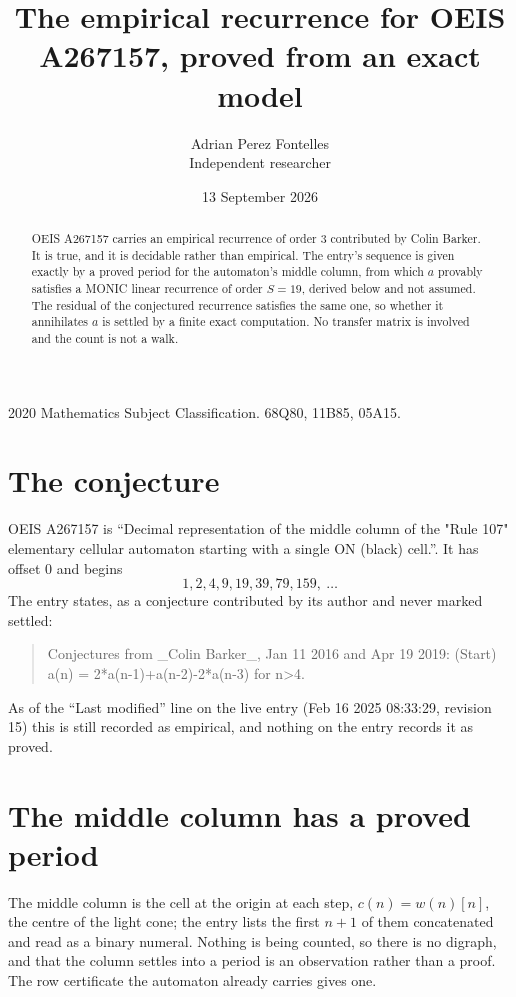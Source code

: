 \documentclass[11pt,a4paper]{article}
\title{The empirical recurrence for OEIS A267157, proved from an exact model}
\author{Adrian Perez Fontelles\\ \small Independent researcher}
\date{13 September 2026}
\theoremstyle{plain}
\theoremstyle{definition}
\begin{document}
\maketitle

\begin{abstract}
OEIS A267157 carries an empirical recurrence of order $3$ contributed by Colin Barker. It is true, and it is
decidable rather than empirical. The entry's sequence is given exactly by a proved period for the automaton's middle column, from
which $a$ provably satisfies a MONIC linear recurrence of order $S=19$, derived below and not
assumed. The residual of the conjectured recurrence satisfies the same one, so whether it
annihilates $a$ is settled by a finite exact computation. No transfer matrix is involved and
the count is not a walk.
\end{abstract}

\noindent\small 2020 Mathematics Subject Classification. 68Q80, 11B85, 05A15.\normalsize

\section{The conjecture}

OEIS A267157 is ``Decimal representation of the middle column of the "Rule 107" elementary cellular automaton starting with a single ON (black) cell.''. It has offset $0$ and begins
\[
1, 2, 4, 9, 19, 39, 79, 159,\ \dots
\]
The entry states, as a conjecture contributed by its author and never marked settled:
\begin{quote}
Conjectures from \_Colin Barker\_, Jan 11 2016 and Apr 19 2019: (Start) a(n) = 2*a(n-1)+a(n-2)-2*a(n-3) for n>4.
\end{quote}
As of the ``Last modified'' line on the live entry (Feb 16 2025 08:33:29, revision 15)
this is still recorded as empirical, and nothing on the entry records it as proved.

\section{The middle column has a proved period}

The middle column is the cell at the origin at each step, $c(n)=w(n)[n]$, the centre of the
light cone; the entry lists the first $n+1$ of them concatenated and read as a binary numeral. Nothing is being counted, so there is no digraph, and that
the column settles into a period is an observation rather than a proof. The row certificate the
automaton already carries gives one.
\end{document}
